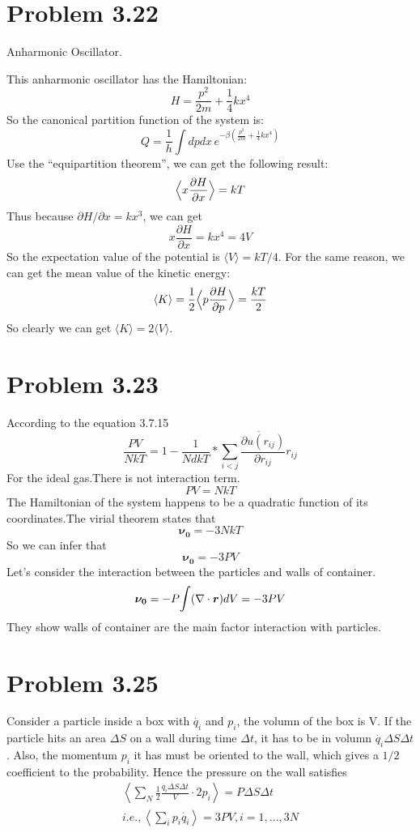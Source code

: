 \documentclass{article}
\begin{document}
\section*{Problem 3.22}
	Anharmonic Oscillator.

	This anharmonic oscillator has the Hamiltonian:
	$$
	H = \frac{p^2}{2m} + \frac{1}{4}kx^4
	$$
	So the canonical partition function of the system is:
	\begin{equation}
	Q = \frac{1}{h}\int dpdx\,e^{-\beta\left(\frac{p^2}{2m} + \frac{1}{4}kx^4\right) }
	\end{equation}
	Use the ``equipartition theorem'', we can get the following result:
	\begin{equation}
	\Big{\langle} x \frac{\partial H}{\partial x}\Big{\rangle} =kT
	\end{equation}
	Thus because $\partial H/\partial x = kx^3$, we can get
	$$
	x\frac{\partial H}{\partial x} = kx^4 = 4V
	$$
	So the expectation value of the potential is $\langle V\rangle = kT/4$. For the same reason, we can get the mean value of the kinetic energy:
	\begin{equation}
	\langle K\rangle = \frac{1}{2}\Big{\langle} p\frac{\partial H}{\partial p}\Big{\rangle} = \frac{kT}{2}
	\end{equation}
	So clearly we can get $\langle K\rangle = 2\langle V\rangle$.
	

\section*{Problem 3.23} %
\label{sec:problem_3_23}
	According to the equation 3.7.15
	$$
	\frac{PV}{NkT}=1-\frac{1}{NdkT}*\overline{\sum_{i<j}\frac{\partial{u(r_{ij})}}{\partial{r_{ij}}}r_{ij}}
	$$
	For the ideal gas.There is not interaction term.
	$$
	PV=NkT
	$$
	The Hamiltonian of the system happens to be a quadratic function of its coordinates.The virial theorem states that
	$$
	\boldsymbol{\nu_0}=-3NkT
	$$
	So we can infer that
	$$
	\boldsymbol{\nu_0}=-3PV
	$$
	Let's consider the interaction between the particles and walls of container. 
	$$
	\boldsymbol{\nu_0}=-P\mathlarger{\int}(\nabla\cdot\boldsymbol{ r})dV=-3PV
	$$
	They show walls of container are the main factor interaction with particles.


\section*{Problem 3.25} %
\label{sec:problem_3_25}
	Consider a particle inside a box with $\dot{q_i} $ and $p_i$, the volumn of the box is V. If the particle hits an area $\Delta S $ on a wall during time $\Delta t $, it has to be in volumn $\dot{q_i} \Delta S \Delta t $. Also, the momentum $p_i$ it has must be oriented to the wall, which gives a $1/2$ coefficient to the probability. Hence the pressure on the wall satisfies
	\begin{gather*}
		\left<\sum_N \frac{1}{2} \frac{\dot{q_i} \Delta S \Delta t }{V} \cdot 2p_i \right> = P \Delta S \Delta t\\
		i.e., \left<\sum_i p_i \dot{q_i} \right> = 3PV, i=1,...,3N
	\end{gather*}
\end{document}
